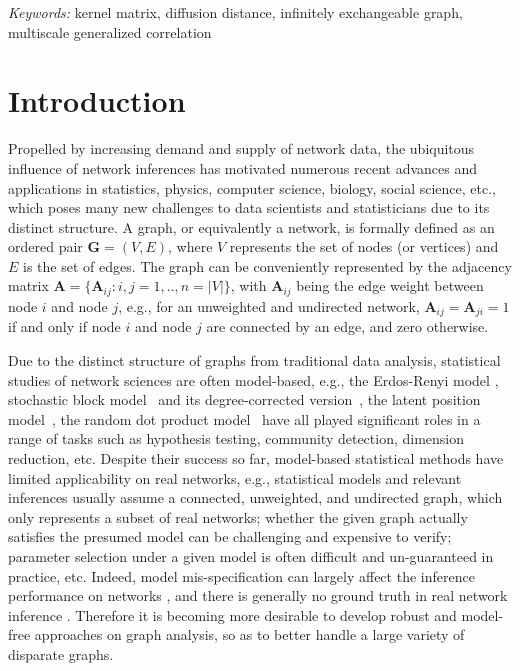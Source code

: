 \documentclass[12pt]{article}
\theoremstyle{definition}
\begin{document}
	\noindent%
	{\it Keywords:} kernel matrix, diffusion distance, infinitely exchangeable graph, multiscale generalized correlation
	
	\sloppy
	
	\newpage
	\section{Introduction}
	\label{sec:intro}
	
	Propelled by increasing demand and supply of network data, the ubiquitous influence of network inferences has motivated numerous recent advances and applications in statistics, physics, computer science, biology, social science, etc., which poses many new challenges to data scientists and statisticians due to its distinct structure. A graph, or equivalently a network, is formally defined as an ordered pair $\mathbf{G}=(V,E)$, where $V$ represents the set of nodes (or vertices) and $E$ is the set of edges. The graph can be conveniently represented by the adjacency matrix $\mathbf{A} = \{\mathbf{A}_{ij} : i,j= 1,..,n = |V| \}$, with $\mathbf{A}_{ij}$ being the edge weight between node $i$ and node $j$, e.g., for an unweighted and undirected network, $\mathbf{A}_{ij} =\mathbf{A}_{ji} = 1$ if and only if node $i$ and node $j$ are connected by an edge, and zero otherwise.
	
	Due to the distinct structure of graphs from traditional data analysis, statistical studies of network sciences are often model-based, e.g., the Erdos-Renyi model \citep{erdosrenyi1959,Gilbert1959}, stochastic block model~\citep{HollandEtAl1983, rohe2011spectral,SussmanEtAl2012,Lei2015} and its degree-corrected version~\citep{karrer2011stochastic, ZhaoLevinaZhu2012}, the latent position model~\citep{TangSussmanPriebe2013,fosdick2015testing}, the random dot product model~\citep{YoungScheinerman2007, sussman2014consistent} have all played significant roles in a range of tasks such as hypothesis testing, community detection, dimension reduction, etc. Despite their success so far, model-based statistical methods have limited applicability on real networks, e.g., statistical models and relevant inferences usually assume a connected, unweighted, and undirected graph, which only represents a subset of real networks; whether the given graph actually satisfies the presumed model can be challenging and expensive to verify; parameter selection under a given model is often difficult and un-guaranteed in practice, etc. Indeed, model mis-specification can largely affect the inference performance on networks \citep{ChenShenVogelsteinPriebe2016}, and there is generally no ground truth in real network inference \citep{Leto2017}. Therefore it is becoming more desirable to develop robust and model-free approaches on graph analysis, so as to better handle a large variety of disparate graphs. 
	
\end{document}
